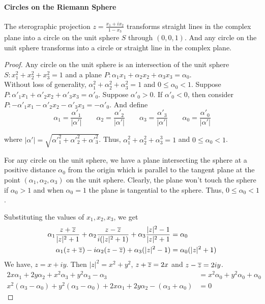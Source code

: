 \paragraph{Circles on the Riemann Sphere}
\begin{remark}
	The sterographic projection $z = \frac{x_1+ix_2}{1-x_3}$ transforms straight lines in the complex plane into a circle on the unit sphere $S$ through $(0,0,1)$.
	And any circle on the unit sphere transforms into a circle or straight line in the complex plane.
\end{remark}
\begin{proof}
	Any circle on the unit sphere is an intersection of 
	the unit sphere $S : x_1^2+x_2^2+x_3^2=1$ and
	a plane $P : \alpha_1x_1+\alpha_2x_2+ \alpha_3x_3 = \alpha_0$.\\

	Without loss of generality, $\alpha_1^2+\alpha_2^2+\alpha_3^2 = 1$ and $0 \le \alpha_0 < 1$.
	Suppose $P : \alpha'_1 x_1 + \alpha'_2 x_2 + \alpha'_3 x_3 = \alpha'_0$.
	Suppose $\alpha'_0 > 0$.
	If $\alpha'_0 < 0$, then consider $P : -\alpha'_1 x_1 - \alpha'_2 x_2 - \alpha'_3 x_3 = -\alpha'_0$.
	And define
	\[ 
	\alpha_1 = \frac{\alpha'_1}{|\alpha'|} \qquad
	\alpha_2 = \frac{\alpha'_2}{|\alpha'|} \qquad
	\alpha_3 = \frac{\alpha'_3}{|\alpha'|} \qquad
	\alpha_0 = \frac{\alpha'_0}{|\alpha'|}\] 

	where $|\alpha'| = \sqrt{{\alpha'}_1^2 + {\alpha'}_2^2 + {\alpha'}_3^2}$.
	Thus, $\alpha_1^2 + \alpha_2^2+\alpha_3^3 = 1$ and $0 \le \alpha_0 < 1$.\\

\begin{commentary}
	For any circle on the unit sphere, we have a plane intersecting the sphere at a positive distance $\alpha_0$ from the origin which is parallel to the tangent plane at the point $(\alpha_1,\alpha_2,\alpha_3)$ on the unit sphere.
	Clearly, the plane won't touch the sphere if $\alpha_0 > 1$ and when $\alpha_0 = 1$ the plane is tangential to the sphere.
	Thus, $0 \le \alpha_0 < 1$.\\
\end{commentary}

	\noindent Substituting the values of $x_1,x_2,x_3$, we get
	\begin{align*}
		\alpha_1 \frac{z+\overline{z}}{|z|^2+1} + \alpha_2 \frac{z - \overline{z}}{i(|z|^2+1)} + \alpha_3 \frac{|z|^2-1}{|z|^2+1} & = \alpha_0 \\
		\alpha_1 (z+\overline{z}) - i\alpha_2 (z - \overline{z}) + \alpha_3 (|z|^2-1) & = \alpha_0 (|z|^2+1)
	\end{align*}
		We have, $z = x+iy$.
		Then $|z|^2 = x^2+y^2$, $z+\overline{z} = 2x$ and $z - \overline{z} = 2iy$.
	\begin{align*}
		2x\alpha_1 + 2y\alpha_2 + x^2\alpha_3 + y^2\alpha_3-\alpha_3 & = x^2\alpha_0 + y^2 \alpha_0+\alpha_0 \\
		x^2(\alpha_3-\alpha_0) + y^2(\alpha_3-\alpha_0) + 2x\alpha_1 + 2y\alpha_2-(\alpha_3+\alpha_0) &= 0
	\end{align*}
	

\end{proof}
